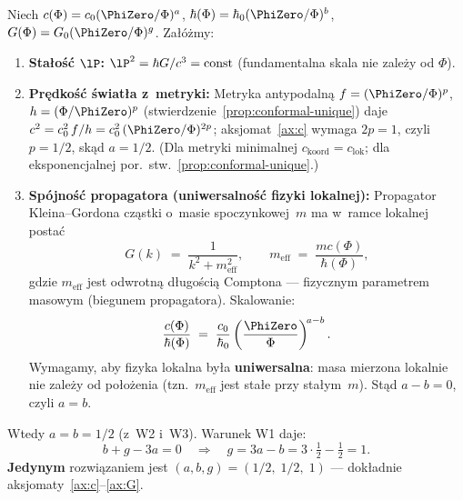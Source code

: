 \begin{theorem}\label{thm:exponents}
Niech $c(\Phi) = c_0(\PhiZero/\Phi)^a$,
$\hbar(\Phi) = \hbar_0(\PhiZero/\Phi)^b$,
$G(\Phi) = G_0(\PhiZero/\Phi)^g$. Za\l{}\'o\.zmy:
\begin{enumerate}[nosep]
  \item[(W1)] \textbf{Sta\l{}o\'s\'c $\lP$:}
    $\lP^2 = \hbar G/c^3 = \mathrm{const}$
    (fundamentalna skala nie zale\.zy od $\Phi$).
  \item[(W2)] \textbf{Pr\k{e}dko\'s\'c \'swiat\l{}a z~metryki:}
    Metryka antypodaln\k{a} $f = (\PhiZero/\Phi)^p$,
    $h = (\Phi/\PhiZero)^p$ (stwierdzenie~\ref{prop:conformal-unique})
    daje $c^2 = c_0^2\,f/h
    = c_0^2\,(\PhiZero/\Phi)^{2p}$; aksjomat~\ref{ax:c}
    wymaga $2p = 1$, czyli $p = 1/2$, sk\k{a}d $a = 1/2$.
    (Dla metryki minimalnej $c_{\mathrm{koord}} = c_{\mathrm{lok}}$;
    dla eksponencjalnej por.\ stw.~\ref{prop:conformal-unique}.)
  \item[(W3)] \textbf{Sp\'ojno\'s\'c propagatora (uniwersalno\'s\'c
    fizyki lokalnej):}
    Propagator Kleina--Gordona cz\k{a}stki o~masie spoczynkowej~$m$
    ma w~ramce lokalnej posta\'c
    \[
      G(k) \;=\; \frac{1}{k^2 + m_{\mathrm{eff}}^2},
      \qquad
      m_{\mathrm{eff}} \;=\; \frac{mc(\Phi)}{\hbar(\Phi)},
    \]
    gdzie $m_{\mathrm{eff}}$ jest odwrotn\k{a} d\l{}ugo\'sci\k{a}
    Comptona --- fizycznym parametrem masowym
    (biegunem propagatora). Skalowanie:
    \[
      \frac{c(\Phi)}{\hbar(\Phi)}
      \;=\; \frac{c_0}{\hbar_0}
            \left(\frac{\PhiZero}{\Phi}\right)^{\!a-b}.
    \]
    Wymag\-amy, aby fizyka lokalna by\l{}a \textbf{uniwersalna}:
    masa mierzona lokalnie nie zale\.zy od po\l{}o\.zenia
    (tzn.\ $m_{\mathrm{eff}}$ jest sta\l{}e przy sta\l{}ym~$m$).
    St\k{a}d $a - b = 0$, czyli $a = b$.
\end{enumerate}
Wtedy $a = b = 1/2$ (z~W2 i~W3). Warunek W1 daje:
\begin{equation}
  b + g - 3a = 0
  \quad\Longrightarrow\quad
  g = 3a - b = 3\cdot\tfrac{1}{2} - \tfrac{1}{2} = 1.
\end{equation}
\textbf{Jedynym} rozwi\k{a}zaniem jest $(a,b,g) = (1/2,\;1/2,\;1)$
--- dok\l{}adnie aksjomaty~\ref{ax:c}--\ref{ax:G}.
\end{theorem}

